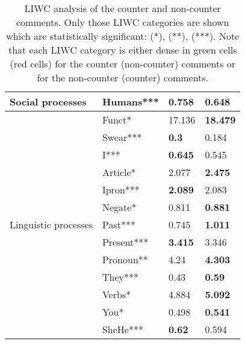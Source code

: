 \documentclass[11pt,a4paper]{article}
\begin{document}
{\begin{table}[!t]
{\begin{tabular}{| p{4.5cm} | p{2.2cm} | p{2cm} |p{2.2cm}|}
\hline


\multirow{ 1}{*}{Social processes}&Humans*** & \cellcolor{green}\textbf{0.758} & \cellcolor{red!20}0.648 \\

\hline


\multirow{13}{*}{Linguistic processes}&Funct* & \cellcolor{red!20}17.136 & \cellcolor{green}\textbf{18.479} \\
									&Swear*** & \cellcolor{green}\textbf{0.3} & \cellcolor{red!20}0.184 \\
                                    &I*** & \cellcolor{green}\textbf{0.645} & \cellcolor{red!20}0.545 \\
                                    &Article* & \cellcolor{red!20}2.077 & \cellcolor{green}\textbf{2.475} \\
                                    &Ipron*** & \cellcolor{green}\textbf{2.089} & \cellcolor{red!20}2.083 \\
                                    &Negate* & \cellcolor{red!20}0.811 & \cellcolor{green}\textbf{0.881} \\
                                    &Past*** & \cellcolor{red!20}0.745 & \cellcolor{green}\textbf{1.011} \\
                                    &Present*** & \cellcolor{green}\textbf{3.415} & \cellcolor{red!20}3.346 \\
                                    &Pronoun** & \cellcolor{red!20}4.24 & \cellcolor{green}\textbf{4.303} \\
                                    &They*** & \cellcolor{red!20}0.43 & \cellcolor{green}\textbf{0.59} \\
                                  	&Verbs* & \cellcolor{red!20}4.884 & \cellcolor{green}\textbf{5.092} \\
                                  	&You* & \cellcolor{red!20}0.498 & \cellcolor{green}\textbf{0.541} \\
                                    &SheHe*** & \cellcolor{green}\textbf{0.62} & \cellcolor{red!20}0.594 \\

			\hline
\end{tabular}}
\caption{LIWC analysis of the counter and non-counter comments. Only those LIWC categories are shown which are statistically significant:  (*),  (**),  (***). Note that each LIWC category is either dense in green cells (red cells) for the counter (non-counter) comments or for the non-counter (counter) comments.}
~\label{tab:liwc_analysis}
\end{table}


}
\end{document}

